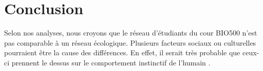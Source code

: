 \documentclass[twoside,twocolumn]{article}
\begin{document}
\section{Conclusion}
Selon nos analyses, nous croyons que le réseau d’étudiants du cour BIO500 n’est pas comparable à un réseau écologique. Plusieurs facteurs sociaux ou culturelles pourraient être la cause des différences. En effet, il serait très probable que ceux-ci prennent le dessus sur le comportement instinctif de l’humain \citep{nicholson1998hardwired}.







\end{document}
